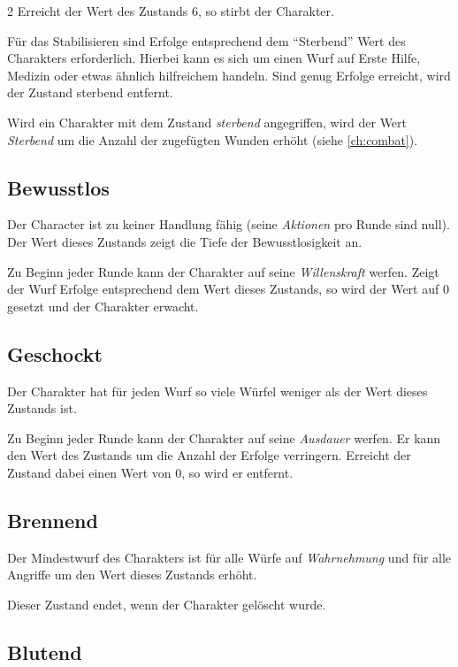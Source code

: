 \begin{multicols}{2}
Erreicht der Wert des Zustands 6, so stirbt der Charakter.

Für das Stabilisieren sind Erfolge entsprechend dem ``Sterbend'' Wert des Charakters erforderlich. Hierbei kann es sich um einen Wurf auf Erste Hilfe, Medizin oder etwas ähnlich hilfreichem handeln. Sind genug Erfolge erreicht, wird der Zustand sterbend entfernt.

Wird ein Charakter mit dem Zustand \textit{sterbend} angegriffen, wird der Wert \textit{Sterbend} um die Anzahl der zugefügten Wunden erhöht (siehe \cref{ch:combat}).

\subsection{Bewusstlos}

Der Character ist zu keiner Handlung fähig (seine \textit{Aktionen} pro Runde sind null). Der Wert dieses Zustands zeigt die Tiefe der Bewusstlosigkeit an.

Zu Beginn jeder Runde kann der Charakter auf seine \textit{Willenskraft} werfen. Zeigt der Wurf Erfolge entsprechend dem Wert dieses Zustands, so wird der Wert auf 0 gesetzt und der Charakter erwacht.

\subsection{Geschockt}

Der Charakter hat für jeden Wurf so viele Würfel weniger als der Wert dieses Zustands ist.

Zu Beginn jeder Runde kann der Charakter auf seine \textit{Ausdauer} werfen. Er kann den Wert des Zustands um die Anzahl der Erfolge verringern. Erreicht der Zustand dabei einen Wert von 0, so wird er entfernt.

\subsection{Brennend}

Der Mindestwurf des Charakters ist für alle Würfe auf \textit{Wahrnehmung} und für alle Angriffe um den Wert dieses Zustands erhöht.

Dieser Zustand endet, wenn der Charakter gelöscht wurde.

\subsection{Blutend}


\end{multicols}
